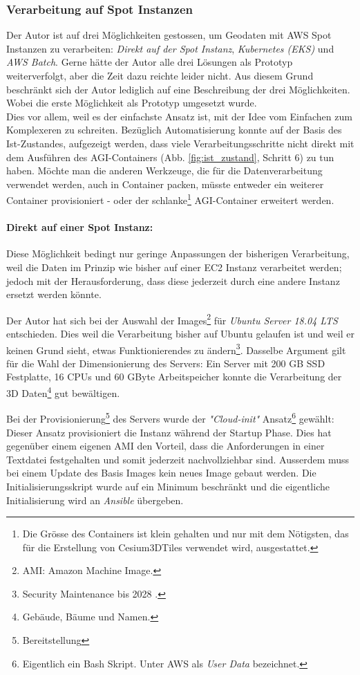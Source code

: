 \subsubsection{Verarbeitung auf Spot Instanzen}
Der Autor ist auf drei Möglichkeiten gestossen, um Geodaten mit AWS Spot Instanzen zu verarbeiten: \emph{Direkt auf der Spot Instanz}, \emph{Kubernetes (EKS)} und \emph{AWS Batch}. Gerne hätte der Autor alle drei Lösungen als Prototyp weiterverfolgt, aber die Zeit dazu reichte leider nicht. Aus diesem Grund beschränkt sich der Autor lediglich auf eine Beschreibung der drei Möglichkeiten. Wobei die erste Möglichkeit als Prototyp umgesetzt wurde.\\
Dies vor allem, weil es der einfachste Ansatz ist, mit der Idee vom Einfachen zum Komplexeren zu schreiten.
Bezüglich Automatisierung konnte auf der Basis des Ist-Zustandes, aufgezeigt werden, dass viele Verarbeitungsschritte nicht direkt mit dem Ausführen des AGI-Containers (Abb. \ref{fig:ist_zustand}, Schritt 6) zu tun haben. Möchte man die anderen Werkzeuge, die für die Datenverarbeitung verwendet werden, auch in Container packen, müsste entweder ein weiterer Container provisioniert - oder der schlanke\footnote{Die Grösse des Containers ist klein gehalten und nur mit dem Nötigsten, das für die Erstellung von Cesium3DTiles verwendet wird, ausgestattet.} AGI-Container erweitert werden.

\paragraph{Direkt auf einer Spot Instanz:}
Diese Möglichkeit bedingt nur geringe Anpassungen der bisherigen Verarbeitung, weil die Daten im Prinzip wie bisher auf einer EC2 Instanz verarbeitet werden; jedoch mit der Herausforderung, dass diese jederzeit durch eine andere Instanz ersetzt werden könnte.

Der Autor hat sich bei der Auswahl der Images\footnote{AMI: Amazon Machine Image.} für \emph{Ubuntu Server 18.04 LTS} entschieden. Dies weil die Verarbeitung bisher auf Ubuntu gelaufen ist und weil er keinen Grund sieht, etwas Funktionierendes zu ändern\footnote{Security Maintenance bis 2028 \cite{Ubuntu2020}.}. Dasselbe Argument gilt für die Wahl der Dimensionierung des Servers: Ein Server mit 200 GB SSD Festplatte, 16 CPUs und 60 GByte Arbeitspeicher konnte die Verarbeitung der 3D Daten\footnote{Gebäude, Bäume und Namen.} gut bewältigen.

Bei der Provisionierung\footnote{Bereitstellung} des Servers wurde der \emph{"Cloud-init"} Ansatz\footnote{Eigentlich ein Bash Skript. Unter AWS als \emph{User Data} bezeichnet.} gewählt: Dieser Ansatz provisioniert die Instanz während der Startup Phase. Dies hat gegenüber einem eigenen AMI den Vorteil, dass die Anforderungen in einer Textdatei festgehalten und somit jederzeit nachvollziehbar sind. Ausserdem muss bei einem Update des Basis Images kein neues Image gebaut werden.
Die Initialisierungsskript wurde auf ein Minimum beschränkt und die eigentliche Initialisierung wird an \emph{Ansible} übergeben. 

